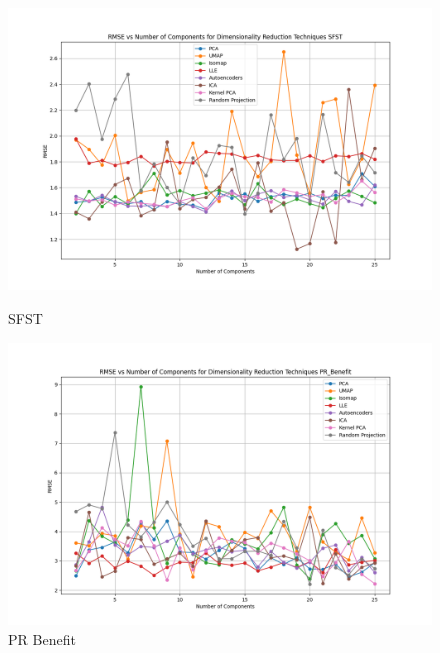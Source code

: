\begin{figure}[H]
    \centering
    \begin{minipage}{0.45\textwidth}
        \centering
        \includegraphics[width=\linewidth]{reg_section_all/images_dimred_results/dimensionality_reduction_rmse_plot_SFST_best.png}
        \caption{SFST}
        \label{fig:sfst_reg_dimred_training}
    \end{minipage}\hfill
    \begin{minipage}{0.45\textwidth}
        \centering
        \includegraphics[width=\linewidth]{reg_section_all/images_dimred_results/dimensionality_reduction_rmse_plot_PR_Benefit_best.png}
        \caption{PR Benefit}
        \label{fig:pr_ben_reg_dimred_training}
    \end{minipage}
\end{figure}

